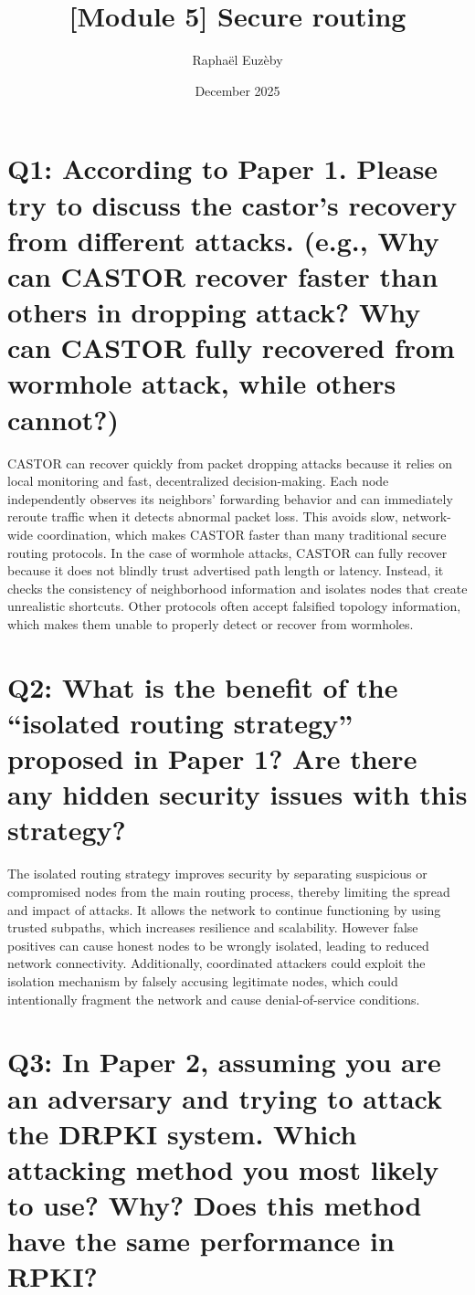 \documentclass{article}
\title{[Module 5] Secure routing}
\author{Raphaël Euzèby}
\date{December 2025}
\begin{document}
\maketitle


\section*{
Q1: According to Paper 1. Please try to discuss the castor's recovery from different attacks. (e.g., Why can CASTOR recover faster than others in dropping attack? Why can CASTOR fully recovered from wormhole attack, while others cannot?)
}

CASTOR can recover quickly from packet dropping attacks because it relies on local monitoring and fast, decentralized decision-making. Each node independently observes its neighbors’ forwarding behavior and can immediately reroute traffic when it detects abnormal packet loss. This avoids slow, network-wide coordination, which makes CASTOR faster than many traditional secure routing protocols. In the case of wormhole attacks, CASTOR can fully recover because it does not blindly trust advertised path length or latency. Instead, it checks the consistency of neighborhood information and isolates nodes that create unrealistic shortcuts. Other protocols often accept falsified topology information, which makes them unable to properly detect or recover from wormholes.



\section*{
Q2: What is the benefit of the “isolated routing strategy” proposed in Paper 1? Are there any hidden security issues with this strategy?
}

The isolated routing strategy improves security by separating suspicious or compromised nodes from the main routing process, thereby limiting the spread and impact of attacks. It allows the network to continue functioning by using trusted subpaths, which increases resilience and scalability. However false positives can cause honest nodes to be wrongly isolated, leading to reduced network connectivity. Additionally, coordinated attackers could exploit the isolation mechanism by falsely accusing legitimate nodes, which could intentionally fragment the network and cause denial-of-service conditions.

\section*{
Q3: In Paper 2, assuming you are an adversary and trying to attack the DRPKI system. Which attacking method you most likely to use? Why? Does this method have the same performance in RPKI?
}
\end{document}
